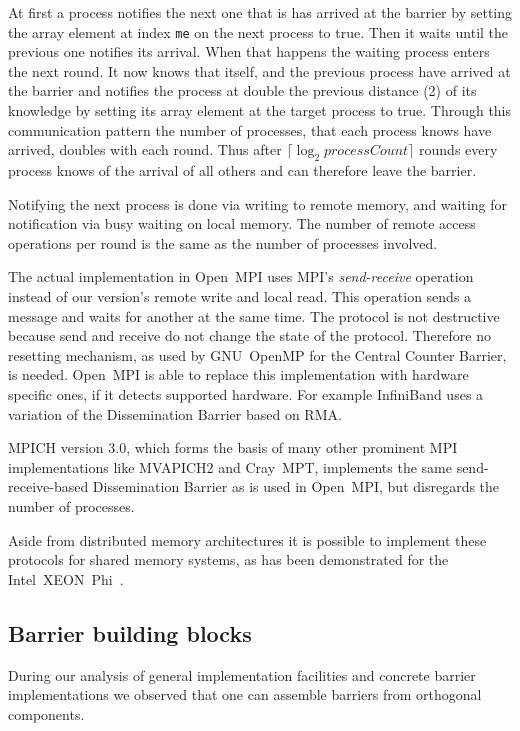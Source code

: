 \documentclass[a4paper, 10pt]{article}
\begin{document}
At first a process notifies the next one that is has arrived at the barrier by setting the array element at index \texttt{me} on the next process to true. Then it waits until the previous one notifies its arrival. When that happens the waiting process enters the next round. It now knows that itself, and the previous process have arrived at the barrier and notifies the process at double the previous distance (2) of its knowledge by setting its array element at the target process to true. Through this communication pattern the number of processes, that each process knows have arrived, doubles with each round. Thus after $\lceil \log_2 \mathit{processCount} \rceil$ rounds every process knows of the arrival of all others and can therefore leave the barrier.

Notifying the next process is done via writing to remote memory, and waiting for notification via busy waiting on local memory. The number of remote access operations per round is the same as the number of processes involved.

The actual implementation in Open~MPI uses MPI's \emph{send-receive} operation instead of our version's remote write and local read. This operation sends a message and waits for another at the same time. The protocol is not destructive because send and receive do not change the state of the protocol. Therefore no resetting mechanism, as used by GNU~OpenMP for the Central Counter Barrier, is needed.
Open~MPI is able to replace this implementation with hardware specific ones, if it detects supported hardware. For example InfiniBand uses a variation of the Dissemination Barrier based on RMA\cite{hoefler2006a}.

MPICH version 3.0, which forms the basis of many other prominent MPI implementations like MVAPICH2 and Cray~MPT, implements the same send-receive-based Dissemination Barrier as is used in Open~MPI, but disregards the number of processes.

Aside from distributed memory architectures it is possible to implement these protocols for shared memory systems, as has been demonstrated for the Intel~XEON~Phi~\cite{hoefler2013}.

\subsection{Barrier building blocks}
\label{ssec:background-building-blocks}
During our analysis of general implementation facilities and concrete barrier implementations we observed that one can assemble barriers from orthogonal components.
\end{document}
